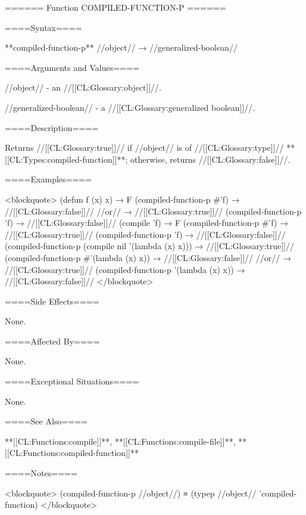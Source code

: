 ====== Function COMPILED-FUNCTION-P ======

====Syntax====

**compiled-function-p** //object// → //generalized-boolean//

====Arguments and Values====

//object// - an //[[CL:Glossary:object]]//.

//generalized-boolean// - a //[[CL:Glossary:generalized boolean]]//.

====Description====

Returns //[[CL:Glossary:true]]// if //object// is of //[[CL:Glossary:type]]// **[[CL:Types:compiled-function]]**; otherwise, returns //[[CL:Glossary:false]]//.

====Examples====

<blockquote> (defun f (x) x) → F (compiled-function-p #'f) → //[[CL:Glossary:false]]// //or// → //[[CL:Glossary:true]]// (compiled-function-p 'f) → //[[CL:Glossary:false]]// (compile 'f) → F (compiled-function-p #'f) → //[[CL:Glossary:true]]// (compiled-function-p 'f) → //[[CL:Glossary:false]]// (compiled-function-p (compile nil '(lambda (x) x))) → //[[CL:Glossary:true]]// (compiled-function-p #'(lambda (x) x)) → //[[CL:Glossary:false]]// //or// → //[[CL:Glossary:true]]// (compiled-function-p '(lambda (x) x)) → //[[CL:Glossary:false]]// </blockquote>

====Side Effects====

None.

====Affected By====

None.

====Exceptional Situations====

None.

====See Also====

**[[CL:Functions:compile]]**, **[[CL:Functions:compile-file]]**, **[[CL:Functions:compiled-function]]**

====Notes====

<blockquote> (compiled-function-p //object//) ≡ (typep //object// 'compiled-function) </blockquote>

